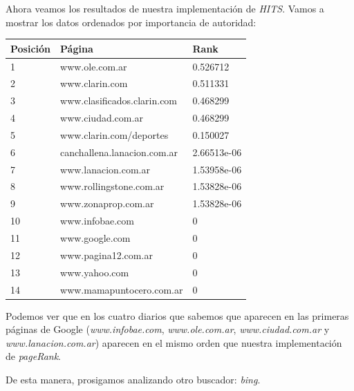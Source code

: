 Ahora veamos los resultados de nuestra implementación de \textit{HITS}. Vamos a mostrar los datos ordenados por importancia de autoridad:

\begin{center}
    \begin{tabular}{| l | l | l |}
    \hline
    Posición & Página & Rank  \\ \hline
    
	1 & www.ole.com.ar & 0.526712 \\ \hline
	2 & www.clarin.com & 0.511331 \\ \hline
	3 & www.clasificados.clarin.com & 0.468299 \\ \hline
	4 & www.ciudad.com.ar & 0.468299 \\ \hline
	5 & www.clarin.com/deportes & 0.150027	 \\ \hline
	6 & canchallena.lanacion.com.ar & 2.66513e-06 \\ \hline
	7 & www.lanacion.com.ar  & 1.53958e-06 \\ \hline
	8 & www.rollingstone.com.ar & 1.53828e-06 \\ \hline
	9 & www.zonaprop.com.ar & 1.53828e-06 \\ \hline
	10 & www.infobae.com & 0 \\ \hline
	11 & www.google.com & 0  \\ \hline
	12 & www.pagina12.com.ar & 0	\\ \hline		
	13 & www.yahoo.com & 0 \\ \hline
	14 & www.mamapuntocero.com.ar & 0 \\ \hline   
    \end{tabular}
\end{center}

Podemos ver que en los cuatro diarios que sabemos que aparecen en las primeras páginas de Google (\textit{www.infobae.com}, \textit{www.ole.com.ar}, \textit{www.ciudad.com.ar} y \textit{www.lanacion.com.ar}) aparecen en el mismo orden que nuestra implementación de \textit{pageRank}.
\par 
De esta manera, prosigamos analizando otro buscador: \textit{bing}.

